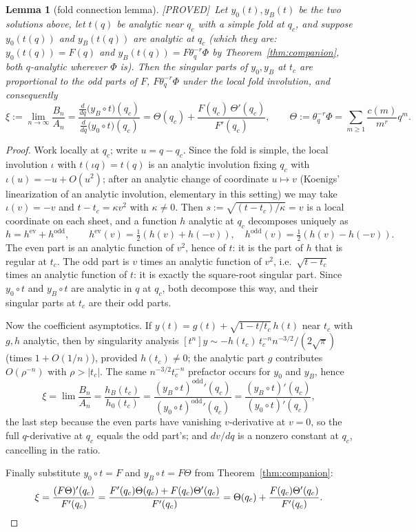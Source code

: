 \documentclass[11pt,reqno]{amsart}
\theoremstyle{plain}
\newtheorem{lemma}[theorem]{Lemma}
\theoremstyle{definition}
\theoremstyle{remark}
\newcommand{\thq}{\theta_q}
\newcommand{\Proved}{\textup{\textsf{[PROVED]}}}
\begin{document}
\begin{lemma}[fold connection lemma]\label{lem:fold}
\Proved\
Let $y_0(t),y_B(t)$ be the two solutions above, let $t(q)$ be analytic near
$q_c$ with a simple fold at $q_c$, and suppose $y_0(t(q))$ and $y_B(t(q))$
are analytic at $q_c$ (which they are: $y_0(t(q))=F(q)$ and
$y_B(t(q))=F\thq^{-r}\Phi$ by Theorem~\ref{thm:companion}, both $q$-analytic
wherever $\Phi$ is). Then the singular parts of $y_0,y_B$ at $t_c$ are
proportional to the \emph{odd} parts of $F$, $F\thq^{-r}\Phi$ under the
local fold involution, and consequently
\[
\xi:=\lim_{n\to\infty}\frac{B_n}{A_n}
=\frac{\frac{d}{dq}\bigl(y_B\circ t\bigr)(q_c)}{\frac{d}{dq}\bigl(y_0\circ
t\bigr)(q_c)}
=\Theta(q_c)+\frac{F(q_c)\,\Theta'(q_c)}{F'(q_c)},
\qquad \Theta:=\thq^{-r}\Phi=\sum_{m\ge1}\frac{c(m)}{m^{r}}q^m .
\]
\end{lemma}

\begin{proof}
Work locally at $q_c$; write $u=q-q_c$. Since the fold is simple, the local
involution $\iota$ with $t(\iota q)=t(q)$ is an analytic involution fixing
$q_c$ with $\iota(u)=-u+O(u^2)$; after an analytic change of coordinate
$u\mapsto v$ (Koenigs' linearization of an analytic involution, elementary
in this setting) we may take $\iota(v)=-v$ and $t-t_c=\kappa v^2$ with
$\kappa\neq0$. Then $s:=\sqrt{(t-t_c)/\kappa}=v$ is a local coordinate on
each sheet, and a function $h$ analytic at $q_c$ decomposes uniquely as
\[
h=h^{\mathrm{ev}}+h^{\mathrm{odd}},\qquad
h^{\mathrm{ev}}(v)=\tfrac12(h(v)+h(-v)),\quad
h^{\mathrm{odd}}(v)=\tfrac12(h(v)-h(-v)).
\]
The even part is an analytic function of $v^2$, hence of $t$: it is the
part of $h$ that is regular at $t_c$. The odd part is $v$ times an analytic
function of $v^2$, i.e.\ $\sqrt{t-t_c}$ times an analytic function of $t$:
it is exactly the square-root singular part. Since $y_0\circ t$ and
$y_B\circ t$ are analytic in $q$ at $q_c$, both decompose this way, and
their singular parts at $t_c$ are their odd parts.

Now the coefficient asymptotics. If $y(t)=g(t)+\sqrt{1-t/t_c}\,h(t)$ near
$t_c$ with $g,h$ analytic, then by singularity analysis
$[t^n]y\sim -h(t_c)\,t_c^{-n}n^{-3/2}/(2\sqrt\pi)$ (times $1+O(1/n)$),
provided $h(t_c)\neq0$; the analytic part $g$ contributes
$O(\rho^{-n})$ with $\rho>|t_c|$. The same $n^{-3/2}t_c^{-n}$ prefactor
occurs for $y_0$ and $y_B$, hence
\[
\xi=\lim\frac{B_n}{A_n}
=\frac{h_B(t_c)}{h_0(t_c)}
=\frac{(y_B\circ t)^{\mathrm{odd}}{}'(q_c)}{(y_0\circ
t)^{\mathrm{odd}}{}'(q_c)}
=\frac{(y_B\circ t)'(q_c)}{(y_0\circ t)'(q_c)},
\]
the last step because the even parts have vanishing $v$-derivative at $v=0$,
so the full $q$-derivative at $q_c$ equals the odd part's; and $dv/dq$ is a
nonzero constant at $q_c$, cancelling in the ratio.

Finally substitute $y_0\circ t=F$ and $y_B\circ t=F\Theta$ from
Theorem~\ref{thm:companion}:
\[
\xi=\frac{(F\Theta)'(q_c)}{F'(q_c)}
=\frac{F'(q_c)\Theta(q_c)+F(q_c)\Theta'(q_c)}{F'(q_c)}
=\Theta(q_c)+\frac{F(q_c)\Theta'(q_c)}{F'(q_c)}.\qedhere
\]
\end{proof}
\end{document}
